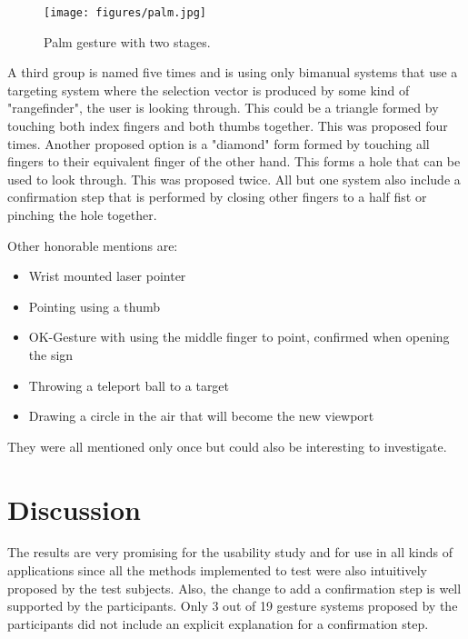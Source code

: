 \begin{figure}[!h]
    \centering
    \texttt{[image: figures/palm.jpg]}
    \caption{Palm gesture with two stages.}
    \label{fig:index2}
\end{figure}

A third group is named five times and is using only bimanual systems that use a targeting system where the selection vector is produced by some kind of "rangefinder", the user is looking through. This could be a triangle formed by touching both index fingers and both thumbs together. This was proposed four times. Another proposed option is a "diamond" form formed by touching all fingers to their equivalent finger of the other hand. This forms a hole that can be used to look through. This was proposed twice. All but one system also include a confirmation step that is performed by closing other fingers to a half fist or pinching the hole together.

Other honorable mentions are:
\begin{itemize}
    \item Wrist mounted laser pointer
    \item Pointing using a thumb
    \item OK-Gesture with using the middle finger to point, confirmed when opening the sign
    \item Throwing a teleport ball to a target
    \item Drawing a circle in the air that will become the new viewport
\end{itemize}

They were all mentioned only once but could also be interesting to investigate.

\section{Discussion}
The results are very promising for the usability study and for use in all kinds of applications since all the methods implemented to test were also intuitively proposed by the test subjects. Also, the change to add a confirmation step is well supported by the participants. Only 3 out of 19 gesture systems proposed by the participants did not include an explicit explanation for a confirmation step. 
